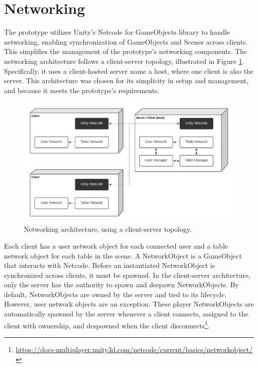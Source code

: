 \section{Networking}

    The prototype utilizes Unity's Netcode for GameObjects library to handle networking, enabling synchronization of GameObjects and Scenes across clients. This simplifies the management of the prototype's networking components. The networking architecture follows a client-server topology, illustrated in Figure \ref{fig:topology}. Specifically, it uses a client-hosted server name a host, where one client is also the server. This architecture was chosen for its simplicity in setup and management, and because it meets the prototype's requirements.

    \begin{figure}[h]
        \centering
        \includegraphics[width=.9\linewidth]{figures/topology.png}
        \caption{Networking architecture, using a client-server topology.}
        \label{fig:topology}
    \end{figure}

    Each client has a user network object for each connected user and a table network object for each table in the scene. A NetworkObject is a GameObject that interacts with Netcode. Before an instantiated NetworkObject is synchronized across clients, it must be spawned. In the client-server architecture, only the server has the authority to spawn and despawn NetworkObjects. By default, NetworkObjects are owned by the server and tied to its lifecycle. However, user network objects are an exception. These player NetworkObjects are automatically spawned by the server whenever a client connects, assigned to the client with ownership, and despawned when the client disconnects\footnote{\url{https://docs-multiplayer.unity3d.com/netcode/current/basics/networkobject/}}.

